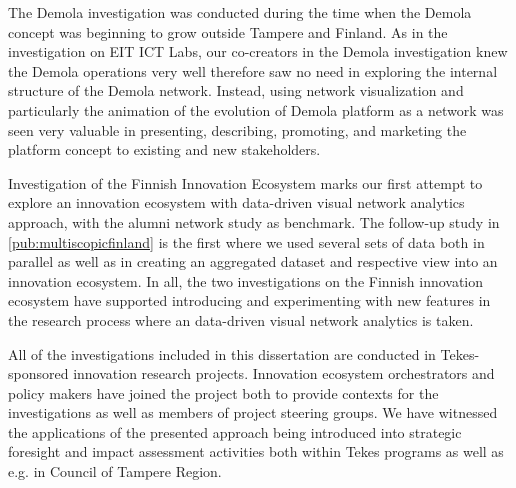 The Demola investigation was conducted during the time when the Demola concept was beginning to grow outside Tampere and Finland. As in the investigation on EIT ICT Labs, our co-creators in the Demola investigation knew the Demola operations very well therefore saw no need in exploring the internal structure of the Demola network. Instead, using network visualization and particularly the animation of the evolution of Demola platform as a network was seen very valuable in presenting, describing, promoting, and marketing the platform concept to existing and new stakeholders. 

Investigation of the Finnish Innovation Ecosystem \citep{Huhtamaki2010AFinancing} marks our first attempt to explore an innovation ecosystem with data-driven visual network analytics approach, with the alumni network study \citep{Rubens2011AlumniAnalysis} as benchmark. The follow-up study in \ref{pub:multiscopicfinland} is the first where we used several sets of data both in parallel as well as in creating an aggregated dataset and respective view into an innovation ecosystem. In all, the two investigations on the Finnish innovation ecosystem have supported introducing and experimenting with new features in the research process where an data-driven visual network analytics is taken.

All of the investigations included in this dissertation are conducted in Tekes-sponsored innovation research projects. Innovation ecosystem orchestrators and policy makers have joined the project both to provide contexts for the investigations as well as members of project steering groups. We have witnessed the applications of the presented approach being introduced into strategic foresight and impact assessment activities both within Tekes programs as well as e.g. in Council of Tampere Region.